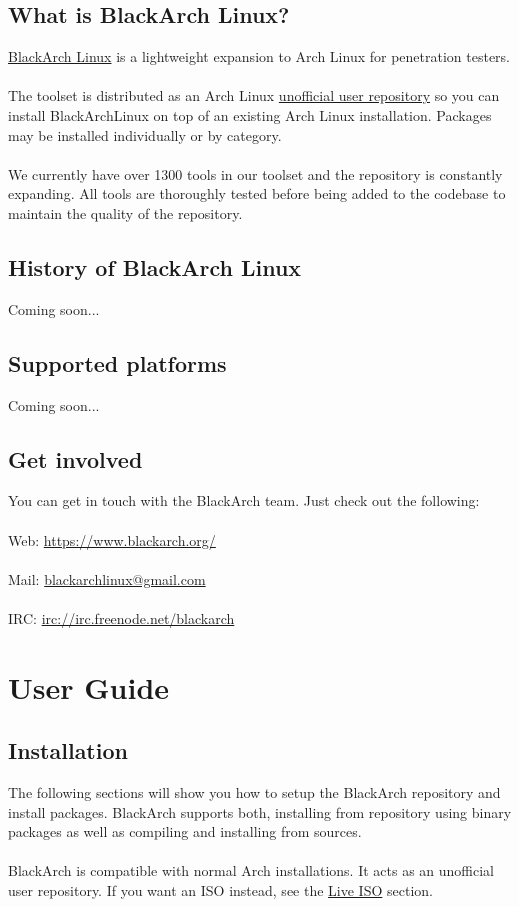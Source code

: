 \documentclass[a4paper, oneside, 11pt]{book}
\begin{document}
\section{What is BlackArch Linux?}
\href{https://www.blackarch.org}{BlackArch Linux} is a lightweight expansion to
Arch Linux for penetration testers.
\\\\
The toolset is distributed as an Arch Linux
\href{https://wiki.archlinux.org/index.php/Unofficial\_User\_Repositories}
{unofficial user repository} so you can install BlackArchLinux on top of an
existing Arch Linux installation. Packages may be installed individually or by
category.
\\\\
We currently have over 1300 tools in our toolset and the repository is
constantly expanding. All tools are thoroughly tested before being added to the
codebase to maintain the quality of the repository.

\section{History of BlackArch Linux}
Coming soon...

\section{Supported platforms}
Coming soon...

\section{Get involved}
You can get in touch with the BlackArch team. Just check out the following:
\\\\
Web: \url{https://www.blackarch.org/}
\\\\
Mail: \href{mailto:blackarchlinux@gmail.com}{blackarchlinux@gmail.com}
\\\\
IRC: \url{irc://irc.freenode.net/blackarch}


\chapter{User Guide}

\section{Installation}
The following sections will show you how to setup the BlackArch repository and
install packages. BlackArch supports both, installing from repository using
binary packages as well as compiling and installing from sources.
\\\\
BlackArch is compatible with normal Arch installations. It acts as an unofficial
user repository. If you want an ISO instead, see the
\href{https://www.blackarch.org/downloads.html#iso}{Live ISO} section.
\\\\
\end{document}

